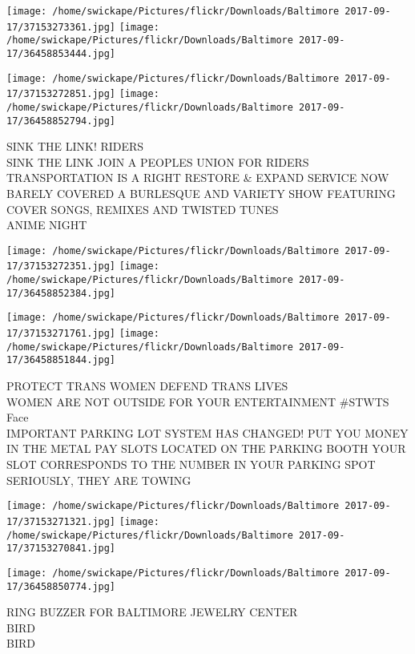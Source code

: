 \documentclass[10pt,letterpaper]{article}
\begin{document}
\texttt{[image: /home/swickape/Pictures/flickr/Downloads/Baltimore 2017-09-17/37153273361.jpg]}
\texttt{[image: /home/swickape/Pictures/flickr/Downloads/Baltimore 2017-09-17/36458853444.jpg]}

\texttt{[image: /home/swickape/Pictures/flickr/Downloads/Baltimore 2017-09-17/37153272851.jpg]}
\texttt{[image: /home/swickape/Pictures/flickr/Downloads/Baltimore 2017-09-17/36458852794.jpg]}

SINK THE LINK!  RIDERS\\
SINK THE LINK JOIN A PEOPLES UNION FOR RIDERS TRANSPORTATION IS A RIGHT RESTORE \& EXPAND SERVICE NOW\\
BARELY COVERED A BURLESQUE AND VARIETY SHOW FEATURING COVER SONGS, REMIXES AND TWISTED TUNES\\
ANIME NIGHT\\
\pagebreak

\texttt{[image: /home/swickape/Pictures/flickr/Downloads/Baltimore 2017-09-17/37153272351.jpg]}
\texttt{[image: /home/swickape/Pictures/flickr/Downloads/Baltimore 2017-09-17/36458852384.jpg]}

\texttt{[image: /home/swickape/Pictures/flickr/Downloads/Baltimore 2017-09-17/37153271761.jpg]}
\texttt{[image: /home/swickape/Pictures/flickr/Downloads/Baltimore 2017-09-17/36458851844.jpg]}

PROTECT TRANS WOMEN DEFEND TRANS LIVES\\
WOMEN ARE NOT OUTSIDE FOR YOUR ENTERTAINMENT \#STWTS\\
Face\\
IMPORTANT PARKING LOT SYSTEM HAS CHANGED!  PUT YOU MONEY IN THE METAL PAY SLOTS LOCATED ON THE PARKING BOOTH YOUR SLOT CORRESPONDS TO THE NUMBER IN YOUR PARKING SPOT SERIOUSLY, THEY ARE TOWING\\
\pagebreak

\texttt{[image: /home/swickape/Pictures/flickr/Downloads/Baltimore 2017-09-17/37153271321.jpg]}
\texttt{[image: /home/swickape/Pictures/flickr/Downloads/Baltimore 2017-09-17/37153270841.jpg]}

\texttt{[image: /home/swickape/Pictures/flickr/Downloads/Baltimore 2017-09-17/36458850774.jpg]}

RING BUZZER FOR BALTIMORE JEWELRY CENTER\\
BIRD\\
BIRD\\
\pagebreak
\end{document}
